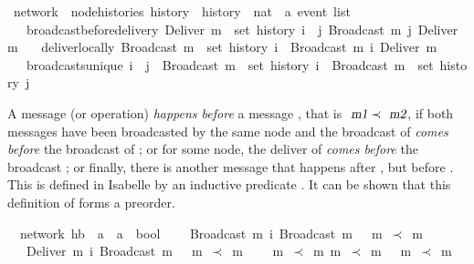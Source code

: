\documentclass[acmlarge,review,anonymous]{acmart}\settopmatter{printfolios=true}
\begin{document}
\begin{isabellebody}
\isanewline
{}\isamarkupfalse%
\ network\ {\isacharequal}\ node{\isacharunderscore}histories\ history\ \ history\ {\isacharcolon}{\isacharcolon}\ {\isachardoublequoteopen}nat\ {\isasymRightarrow}\ {\isacharprime}a\ event\ list{\isachardoublequoteclose}\ {\isacharplus}\isanewline
\ \ \ broadcast{\isacharunderscore}before{\isacharunderscore}delivery{\isacharcolon}\ {\isachardoublequoteopen}Deliver\ m\ {\isasymin}\ set\ {\isacharparenleft}history\ i{\isacharparenright}\ {\isasymLongrightarrow}\ {\isasymexists}j{\isachardot}\ Broadcast\ m\ {\isasymsqsubset}\isactrlsup j\ Deliver\ m{\isachardoublequoteclose}\isanewline
\ \ \ deliver{\isacharunderscore}locally{\isacharcolon}\ {\isachardoublequoteopen}Broadcast\ m\ {\isasymin}\ set\ {\isacharparenleft}history\ i{\isacharparenright}\ {\isasymLongrightarrow}\ Broadcast\ m\ {\isasymsqsubset}\isactrlsup i\ Deliver\ m{\isachardoublequoteclose}\isanewline
\ \ \ broadcasts{\isacharunderscore}unique{\isacharcolon}\ {\isachardoublequoteopen}i\ {\isasymnoteq}\ j\ {\isasymLongrightarrow}\ Broadcast\ m\ {\isasymin}\ set\ {\isacharparenleft}history\ i{\isacharparenright}\ {\isasymLongrightarrow}\ Broadcast\ m\ {\isasymnotin}\ set\ {\isacharparenleft}history\ j{\isacharparenright}{\isachardoublequoteclose}\isanewline
\end{isabellebody}

A message  (or operation) \emph{happens before} a message ,
that is $\isa{m1} \prec \isa{m2}$, if both messages have been broadcasted by the
same node and the broadcast of  \emph{comes before} the broadcast of
; or for some node, the deliver of  \emph{comes before}
the broadcast ; or finally, there is another message that
happens after , but before .  This is defined in Isabelle by an
inductive predicate .
It can be shown that this definition of  forms a
preorder.

\begin{isabellebody}
\isanewline
{}\isamarkupfalse%
\ {\isacharparenleft}\ network{\isacharparenright}\ hb\ {\isacharcolon}{\isacharcolon}\ {\isachardoublequoteopen}{\isacharprime}a\ {\isasymRightarrow}\ {\isacharprime}a\ {\isasymRightarrow}\ bool{\isachardoublequoteclose}\ \isanewline
\ \ {\isachardoublequoteopen}{\isasymlbrakk}\ Broadcast\ m{}\ {\isasymsqsubset}\isactrlsup i\ Broadcast\ m{}\ {\isasymrbrakk}\ {\isasymLongrightarrow}\ m{}\ $\prec$\ m{}{\isachardoublequoteclose}\ {\isacharbar}\isanewline
\ \ {\isachardoublequoteopen}{\isasymlbrakk}\ Deliver\ m{}\ {\isasymsqsubset}\isactrlsup i\ Broadcast\ m{}\ {\isasymrbrakk}\ {\isasymLongrightarrow}\ m{}\ $\prec$\ m{}{\isachardoublequoteclose}\ {\isacharbar}\isanewline
\ \ {\isachardoublequoteopen}{\isasymlbrakk}\ m{}\ $\prec$\  m{}{\isacharsemicolon}\ m{}\ $\prec$\ m{}\ {\isasymrbrakk}\ {\isasymLongrightarrow}\ m{}\ $\prec$\ m{}{\isachardoublequoteclose}\isanewline
\end{isabellebody}
\end{document}
